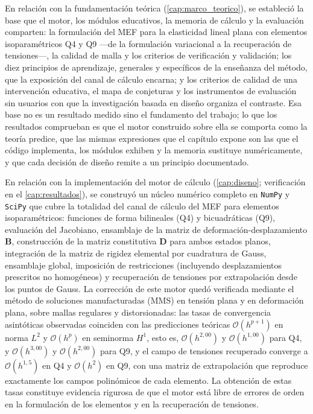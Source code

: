 En relación con la fundamentación teórica (\autoref{cap:marco_teorico}), se estableció la base que el motor, los módulos educativos, la memoria de cálculo y la evaluación comparten: la formulación del MEF para la elasticidad lineal plana con elementos isoparamétricos Q4 y Q9 —de la formulación variacional a la recuperación de tensiones—, la calidad de malla y los criterios de verificación y validación; los diez principios de aprendizaje, generales y específicos de la enseñanza del método, que la exposición del canal de cálculo encarna; y los criterios de calidad de una intervención educativa, el mapa de conjeturas y los instrumentos de evaluación sin usuarios con que la investigación basada en diseño organiza el contraste. Esa base no es un resultado medido sino el fundamento del trabajo; lo que los resultados comprueban es que el motor construido sobre ella se comporta como la teoría predice, que las mismas expresiones que el capítulo expone son las que el código implementa, los módulos exhiben y la memoria sustituye numéricamente, y que cada decisión de diseño remite a un principio documentado.

En relación con la implementación del motor de cálculo (\autoref{cap:diseno}; verificación en el \autoref{cap:resultados}), se construyó un núcleo numérico completo en \texttt{NumPy} y \texttt{SciPy} que cubre la totalidad del canal de cálculo del MEF para elementos isoparamétricos: funciones de forma bilineales (Q4) y bicuadráticas (Q9), evaluación del Jacobiano, ensamblaje de la matriz de deformación-desplazamiento $\bm{B}$, construcción de la matriz constitutiva $\bm{D}$ para ambos estados planos, integración de la matriz de rigidez elemental por cuadratura de Gauss, ensamblaje global, imposición de restricciones (incluyendo desplazamientos prescritos no homogéneos) y recuperación de tensiones por extrapolación desde los puntos de Gauss. La corrección de este motor quedó verificada mediante el método de soluciones manufacturadas (MMS) en tensión plana y en deformación plana, sobre mallas regulares y distorsionadas: las tasas de convergencia asintóticas observadas coinciden con las predicciones teóricas $\mathcal{O}(h^{p+1})$ en norma $L^2$ y $\mathcal{O}(h^{p})$ en seminorma $H^1$, esto es, $\mathcal{O}(h^{2{,}00})$ y $\mathcal{O}(h^{1{,}00})$ para Q4, y $\mathcal{O}(h^{3{,}00})$ y $\mathcal{O}(h^{2{,}00})$ para Q9, y el campo de tensiones recuperado converge a $\mathcal{O}(h^{1{,}5})$ en Q4 y $\mathcal{O}(h^{2})$ en Q9, con una matriz de extrapolación que reproduce exactamente los campos polinómicos de cada elemento. La obtención de estas tasas constituye evidencia rigurosa de que el motor está libre de errores de orden en la formulación de los elementos y en la recuperación de tensiones.

